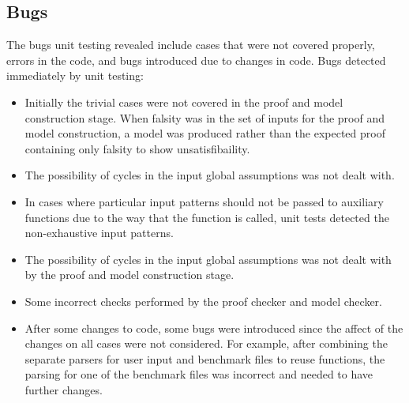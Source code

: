 \subsection*{Bugs}
The bugs unit testing revealed include cases that were not covered properly, errors in the code, and bugs introduced due to changes in code. Bugs detected immediately by unit testing:
\begin{itemize}
\item Initially the trivial cases were not covered in the proof and model construction stage. When falsity was in the set of inputs for the proof and model construction, a model was produced rather than the expected proof containing only falsity to show unsatisfibaility.

\item The possibility of cycles in the input global assumptions was not dealt with.

\item In cases where particular input patterns should not be passed to auxiliary functions due to the way that the function is called, unit tests detected the non-exhaustive input patterns.

\item The possibility of cycles in the input global assumptions was not dealt with by the proof and model construction stage.

\item Some incorrect checks performed by the proof checker and model checker.

\item After some changes to code, some bugs were introduced since the affect of the changes on all cases were not considered. For example, after combining the separate parsers for user input and benchmark files to reuse functions, the parsing for one of the benchmark files was incorrect and needed to have further changes. 
\end{itemize}
